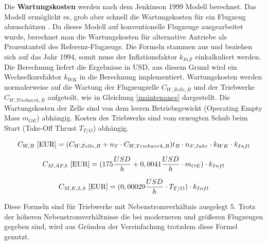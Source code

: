 Die \textbf{Wartungskosten} werden nach dem Jenkinson 1999 Modell berechnet. Das Modell ermöglicht es, grob aber schnell die Wartungskosten 
für ein Flugzeug abzuschätzen \cite{bruge2018wartungskosten}.
Da dieses Modell auf konventionelle Flugzeuge ausgearbeitet wurde, berechnet man die Wartungskosten für alternative Antriebe
als Prozentanteil des Referenz-Flugzeugs. 
Die Formeln stammen aus \cite{bruge2018wartungskosten} und beziehen sich auf das Jahr 1994, somit muss der Inflationsfaktor $k_{Infl}$
einkalkuliert werden. Die Berechnung liefert die Ergebnisse in USD, aus diesem Grund wird ein Wechselkursfaktor $k_{WK}$ in die Berechnung implementiert.
Wartungskosten werden normalerweise auf die Wartung der Flugzeugzelle $C_{W,Zelle,B}$ und der Triebwerke 
$C_{W,Triebwerk,B}$ aufgeteilt, wie in Gleichung \eqref{maintenance} dargestellt. Die Wartungskosten der Zelle sind von dem leeren Betriebsgewicht 
(Operating Empty Mass $m_{OE}$) abhängig. Kosten des Triebwerks sind vom erzeugten Schub beim Start (Take-Off Thrust $T_{T/O}$) abhängig.

\begin{equation}
   {C_{W,B} ~[\text{EUR}]} = (C_{W,Zelle,B} + n_{T} \cdot C_{W,Triebwerk,B} ) t_{B} \cdot n_{F, Jahr} \cdot k_{WK} \cdot k_{Infl}\\
   \label{maintenance}
\end{equation}

\begin{equation}
   {C_{M,AF,b} ~[\text{EUR}]} = (175 \frac{USD}{h} + 0,0041 \frac{USD}{h} \cdot m_{OE} )\cdot k_{Infl}\\
   \label{maintenance Zelle}
\end{equation}

\begin{equation}
   {C_{M,E,L,b} ~[\text{EUR}]} = (0,00029 \frac{USD}{h} \cdot T_{T/O} )\cdot k_{Infl}\\
   \label{maintenance engine}
\end{equation}

Diese Formeln sind für Triebwerke mit Nebenstromverhältnis ausgelegt 5. %
Trotz der höheren Nebenstromverhältnisse die bei moderneren und größeren Flugzeugen gegeben sind,
wird aus Gründen der Vereinfachung trotzdem diese Formel genutzt.


